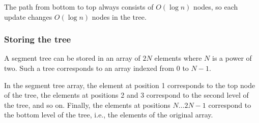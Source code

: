The path from bottom to top
always consists of $O(\log n)$ nodes,
so each update changes $O(\log n)$ nodes in the tree.

\subsubsection{Storing the tree}

A segment tree can be stored in an array
of $2N$ elements where $N$ is a power of two.
Such a tree corresponds to an array
indexed from $0$ to $N-1$.

In the segment tree array,
the element at position 1
corresponds to the top node of the tree,
the elements at positions 2 and 3 correspond to
the second level of the tree, and so on.
Finally, the elements at positions $N \ldots 2N-1$
correspond to the bottom level of the tree, i.e.,
the elements of the original array.

